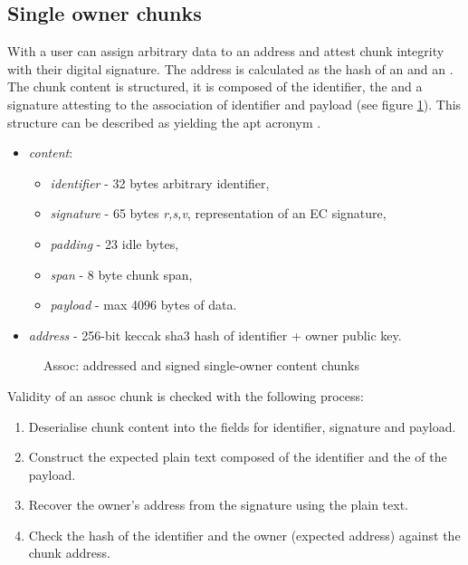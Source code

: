 \subsection{Single owner chunks}\label{sec:single-owner-chunks}

With  a user can assign arbitrary data to an address and attest chunk integrity with their digital signature. The address is calculated as the hash of an  and an . The chunk content is structured, it is composed of the identifier, the  and a signature attesting to the association of identifier and payload (see figure \ref{fig:single-owner-chunks}). This structure can be described as  yielding the apt acronym .

\begin{itemize}
    \item \emph{content}: 
\begin{itemize}
    \item \emph{identifier} - 32 bytes arbitrary identifier, 
    \item \emph{signature} - 65 bytes \emph{r,s,v}, representation of an EC signature,
    \item \emph{padding} - 23 idle bytes,
    \item \emph{span} - 8 byte chunk span,
    \item \emph{payload} - max 4096 bytes of data.
\end{itemize}
    \item \emph{address} - 256-bit keccak sha3 hash of identifier + owner public key.
\end{itemize}


\begin{figure}[htbp]
   \centering
   \caption[Assoc: addressed and signed single-owner content chunks]{Assoc: addressed and signed single-owner content chunks}
   \label{fig:single-owner-chunks}
\end{figure}

Validity of an assoc chunk is checked with the  following process:

\begin{enumerate}
    \item Deserialise chunk content into the fields for identifier, signature and payload.
    \item Construct the expected plain text composed of the identifier and the  of the payload.
    \item Recover the owner's address from the signature using the plain text.
    \item Check the hash of the identifier and the owner (expected address) against the chunk address.
\end{enumerate}

